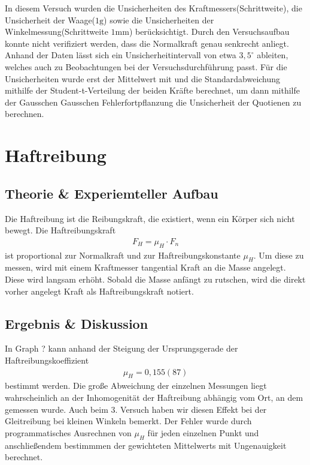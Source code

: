 \documentclass[11pt, a4paper]{article}
\begin{document}
    In diesem Versuch wurden die Unsicherheiten des Kraftmessers(Schrittweite), die Unsicherheit der Waage($1\si{\gram}$)
    sowie die Unsicherheiten der Winkelmessung(Schrittweite $1 \si{\milli\metre}$) berücksichtigt.
    Durch den Versuchsaufbau konnte nicht verifiziert werden, dass die Normalkraft genau senkrecht anliegt.
    Anhand der Daten lässt sich ein Unsicherheitintervall von etwa $3,5^{\circ}$ ableiten, welches auch zu
    Beobachtungen bei der Versuchsdurchführung passt. Für die Unsicherheiten wurde erst der Mittelwert \cite[(29)]{ABW} mit
    und die Standardabweichung mithilfe der Student-t-Verteilung \cite[(15)]{ABW} der beiden Kräfte berechnet, um dann mithilfe der Gausschen
    Gausschen Fehlerfortpflanzung \cite[(19)]{ABW} die Unsicherheit der Quotienen zu berechnen.

    \section{Haftreibung}
    \subsection{Theorie \& Experiemteller Aufbau}
    Die Haftreibung ist die Reibungskraft, die existiert, wenn ein Körper sich nicht bewegt.
    Die Haftreibungskraft
    \begin{align}
        F_H = \mu_H \cdot F_n
    \end{align}
    ist proportional zur Normalkraft und zur Haftreibungskonstante $\mu_H$. Um diese zu messen,
    wird mit einem Kraftmesser tangential Kraft an die Masse angelegt. Diese wird langsam erhöht.
    Sobald die Masse anfängt zu rutschen, wird die direkt vorher angelegt Kraft als Haftreibungskraft notiert.

    \subsection{Ergebnis \& Diskussion}
    In Graph ? kann anhand der Steigung der Ursprungsgerade der Haftreibungskoeffizient
    \begin{align}
        \mu_H = 0,155(87)
    \end{align} 
    bestimmt werden.
    Die große Abweichung der einzelnen Messungen liegt wahrscheinlich an der Inhomogenität der Haftreibung
    abhängig vom Ort, an dem gemessen wurde. Auch beim 3. Versuch haben wir diesen Effekt
    bei der Gleitreibung bei kleinen Winkeln bemerkt. Der Fehler wurde durch programmatisches Ausrechnen von
    $\mu_H$ für jeden einzelnen Punkt und anschließendem bestimmmen der gewichteten Mittelwerts mit
    Ungenauigkeit \cite[(29)]{ABW} berechnet. 
\end{document}
